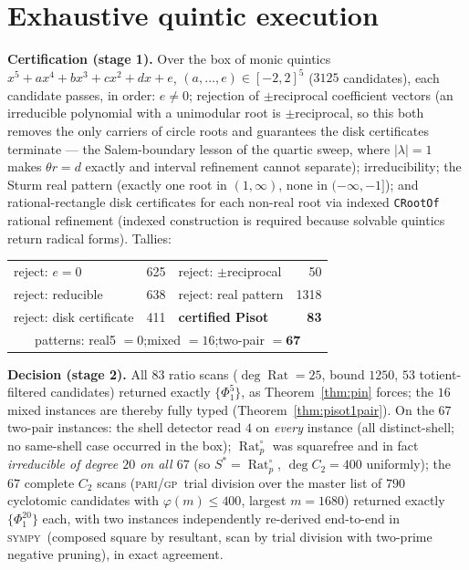 \documentclass[11pt]{article}
\newcommand{\Rat}{\operatorname{Rat}}
\newcommand{\gp}{\textsc{pari/gp}}
\newcommand{\sy}{\textsc{sympy}}
\theoremstyle{definition}
\begin{document}
\section{Exhaustive quintic execution}\label{sec:quintic}

\textbf{Certification (stage 1).} Over the box of monic quintics
$x^5+ax^4+bx^3+cx^2+dx+e$, $(a,\dots,e)\in[-2,2]^5$ ($3125$ candidates), each
candidate passes, in order: $e\neq0$; rejection of $\pm$reciprocal coefficient
vectors (an irreducible polynomial with a unimodular root is $\pm$reciprocal,
so this both removes the only carriers of circle roots and guarantees the disk
certificates terminate --- the Salem-boundary lesson of the quartic sweep, where
$|\lambda|=1$ makes $\theta r=d$ exactly and interval refinement cannot
separate); irreducibility; the Sturm real pattern (exactly one root in
$(1,\infty)$, none in $(-\infty,-1]$); and rational-rectangle disk certificates
for each non-real root via indexed \texttt{CRootOf} rational refinement
(indexed construction is required because solvable quintics return radical
forms). Tallies:

\begin{center}
\begin{tabular}{lrlr}
\hline
reject: $e=0$ & 625 & reject: $\pm$reciprocal & 50\\
reject: reducible & 638 & reject: real pattern & 1318\\
reject: disk certificate & 411 & \textbf{certified Pisot} & \textbf{83}\\
\hline
\multicolumn{4}{c}{patterns: real5 $=0$;\quad mixed $=16$;\quad two-pair $=\mathbf{67}$}\\
\hline
\end{tabular}
\end{center}

\textbf{Decision (stage 2).} All $83$ ratio scans ($\deg\Rat=25$, bound $1250$,
$53$ totient-filtered candidates) returned exactly $\{\Phi_1^5\}$, as
Theorem~\ref{thm:pin} forces; the $16$ mixed instances are thereby fully typed
(Theorem~\ref{thm:pisot1pair}). On the $67$ two-pair instances: the shell
detector read $4$ on \emph{every} instance (all distinct-shell; no same-shell
case occurred in the box); $\Rat_p^{\circ}$ was squarefree and in fact
\emph{irreducible of degree $20$ on all $67$} (so $S^{*}=\Rat_p^{\circ}$,
$\deg C_2=400$ uniformly); the $67$ complete $C_2$ scans (\gp\ trial division
over the master list of $790$ cyclotomic candidates with
$\varphi(m)\le400$, largest $m=1680$) returned exactly $\{\Phi_1^{20}\}$ each,
with two instances independently re-derived end-to-end in \sy\ (composed square
by resultant, scan by trial division with two-prime negative pruning), in exact
agreement.
\end{document}
